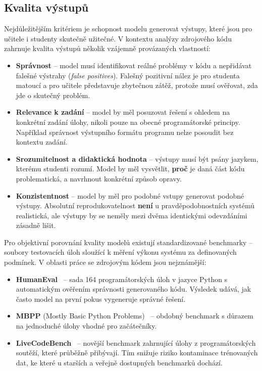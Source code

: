 \subsection{Kvalita výstupů}
\label{subsec:criteria-quality}

Nejdůležitějším kritériem je schopnost modelu generovat výstupy, které jsou pro učitele i studenty skutečně užitečné.
V kontextu analýzy zdrojového kódu zahrnuje kvalita výstupů několik vzájemně provázaných vlastností:

\begin{itemize}
    \item \textbf{Správnost} -- model musí identifikovat reálné problémy v kódu a nepřidávat falešné výstrahy (\textit{false positives}).
    Falešný pozitivní nález je pro studenta matoucí a pro učitele představuje zbytečnou zátěž, protože musí ověřovat, zda jde o skutečný problém.

    \item \textbf{Relevance k zadání} -- model by měl posuzovat řešení s ohledem na konkrétní zadání úlohy, nikoli pouze na obecné programátorské principy.
    Například správnost výstupního formátu programu nelze posoudit bez kontextu zadání.

    \item \textbf{Srozumitelnost a didaktická hodnota} -- výstupy musí být psány jazykem, kterému studenti rozumí.
    Model by měl vysvětlit, \textbf{proč} je daná část kódu problematická, a navrhnout konkrétní způsob opravy.

    \item \textbf{Konzistentnost} -- model by měl pro podobné vstupy generovat podobné výstupy.
    Absolutní reprodukovatelnost \textbf{není} u pravděpodobnostních systémů realistická, ale výstupy by se neměly mezi dvěma identickými odevzdáními zásadně lišit.
\end{itemize}

Pro objektivní porovnání kvality modelů existují standardizované benchmarky -- soubory testovacích úloh sloužící k měření výkonu systému za definovaných podmínek.
V oblasti práce se zdrojovým kódem jsou nejznámější:

\begin{itemize}
    \item \textbf{HumanEval}~\cite{humaneval} -- sada 164 programátorských úloh v jazyce Python s automatickým ověřením správnosti generovaného kódu.
    Výsledek udává, jak často model na první pokus vygeneruje správné řešení.

    \item \textbf{MBPP} (Mostly Basic Python Problems)~\cite{mbpp} -- obdobný benchmark s důrazem na jednoduché úlohy vhodné pro začátečníky.

    \item \textbf{LiveCodeBench}~\cite{livecodebench} -- novější benchmark zahrnující úlohy z programátorských soutěží, které průběžně přibývají.
    Tím snižuje riziko kontaminace trénovaných dat, ke které u starších a veřejně dostupných benchmarků dochází.
\end{itemize}

